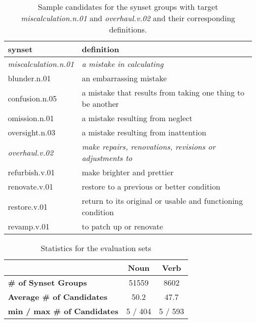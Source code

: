 \documentclass[11pt,a4paper]{article}
\begin{document}
\begin{table*}
    \centering
    \begin{tabular}{l|l}
    \hline
    \textbf{synset} & \textbf{definition} \\ \hline
     \emph{miscalculation.n.01} & \emph{a mistake in calculating} \\
     blunder.n.01 & an embarrassing mistake \\
     confusion.n.05 & a mistake that results from taking one thing to be another \\
     omission.n.01 & a mistake resulting from neglect \\
     oversight.n.03 & a mistake resulting from inattention \\ \hline
     \emph{overhaul.v.02} & \emph{make repairs, renovations, revisions or adjustments to} \\
     refurbish.v.01 & make brighter and prettier \\
     renovate.v.01 & restore to a previous or better condition \\
     restore.v.01 & return to its original or usable and functioning condition \\
     revamp.v.01 & to patch up or renovate \\ \hline

    \end{tabular}
    \caption{Sample candidates for the synset groups with target \emph{miscalculation.n.01} and \emph{overhaul.v.02} and their corresponding definitions.} 
    \label{tab:dataset_samples}
\end{table*}


\begin{table}
    \centering
    \begin{tabular}{l|cc}
    \hline
         & \textbf{Noun} & \textbf{Verb} \\ \hline
         \textbf{\# of Synset Groups} & 51559 & 8602 \\
         \textbf{Average \# of Candidates} & 50.2 & 47.7 \\
         \textbf{min / max \# of Candidates} & 5 / 404 & 5 / 593 \\ \hline
    \end{tabular}
    \caption{Statistics for the evaluation sets}
    \label{tab:dataset_stats}
\end{table}
\end{document}
